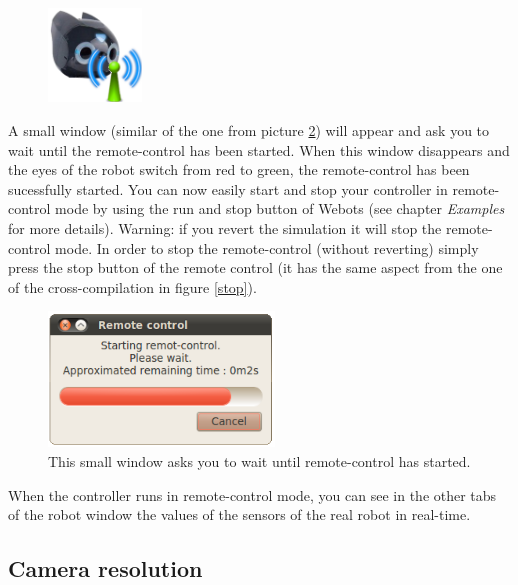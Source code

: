 \documentclass[a4paper, 12pt]{article}  		%
\begin{document}
\begin{figure}[H]
\begin{center}
\includegraphics[width=2.5cm]{remote.png}
\label{send}
\end{center}
\end{figure}

A small window (similar of the one from picture \ref{waitWindow}) will appear and ask you to wait until the remote-control has been started. When this window disappears and the eyes of the robot switch from red to green, the remote-control has been sucessfully started. You can now easily start and stop your controller in remote-control mode by using the run and stop button of Webots (see chapter \textit{Examples} for more details). Warning: if you revert the simulation it will stop the remote-control mode. In order to stop the remote-control (without reverting) simply press the stop button of the remote control (it has the same aspect from the one of the cross-compilation in figure \ref{stop}).\\

\begin{figure}[H]
\begin{center}
\includegraphics[width=6cm]{waitWindow.png}
\caption{This small window asks you to wait until remote-control has started.}
\label{waitWindow}
\end{center}
\end{figure}

When the controller runs in remote-control mode, you can see in the other tabs of the robot window the values of the sensors of the real robot in real-time.\\

\newpage
\subsection{Camera resolution}
\end{document}
